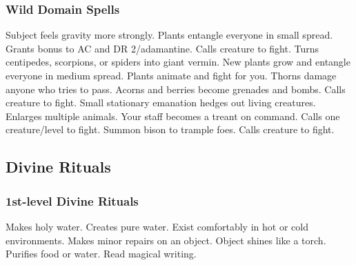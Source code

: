 \subsubsection{Wild Domain Spells}

\begin{spelllist}
   Subject feels gravity more strongly.
   Plants entangle everyone in small spread.
   Grants  bonus to AC and DR 2/adamantine.
  \spellhead[2]{}
  \spellhead[3]{}
   Calls creature to fight.
   Turns centipedes, scorpions, or spiders into giant vermin.
   New plants grow and entangle everyone in medium spread.
   Plants animate and fight for you.
   Thorns damage anyone who tries to pass.
   Acorns and berries become grenades and bombs.
   Calls creature to fight.
   Small stationary emanation hedges out living creatures.
   Enlarges multiple animals.
   Your staff becomes a treant on command.
   Calls one creature/level to fight.
   Summon bison to trample foes.
   Calls creature to fight.
\end{spelllist}

\subsection{Divine Rituals}
\subsubsection{1st-level Divine Rituals}
\begin{rituallist}
     Makes holy water.
     Creates pure water.
     Exist comfortably in hot or cold environments.
     Makes minor repairs on an object.
     Object shines like a torch.
     Purifies food or water.
     Read magical writing.
\end{rituallist}

